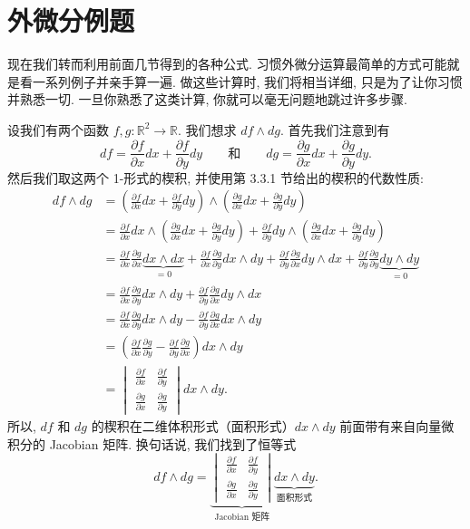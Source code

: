 \section{外微分例题}

现在我们转而利用前面几节得到的各种公式. 习惯外微分运算最简单的方式可能就是看一系列例子并亲手算一遍. 做这些计算时, 我们将相当详细, 只是为了让你习惯并熟悉一切. 一旦你熟悉了这类计算, 你就可以毫无问题地跳过许多步骤.

设我们有两个函数 $f,g:\mathbb{R}^2\to\mathbb{R}$. 我们想求 $df\wedge dg$. 首先我们注意到有
\[
df=\frac{\partial f}{\partial x}dx+\frac{\partial f}{\partial y}dy
\qquad\text{和}\qquad
dg=\frac{\partial g}{\partial x}dx+\frac{\partial g}{\partial y}dy.
\]
然后我们取这两个 1-形式的楔积, 并使用第 3.3.1 节给出的楔积的代数性质: 
\begin{align*}
df\wedge dg&=\left(\frac{\partial f}{\partial x}dx+\frac{\partial f}{\partial y}dy\right)
\wedge\left(\frac{\partial g}{\partial x}dx+\frac{\partial g}{\partial y}dy\right)\\
&=\frac{\partial f}{\partial x}dx\wedge\left(\frac{\partial g}{\partial x}dx+\frac{\partial g}{\partial y}dy\right)
+\frac{\partial f}{\partial y}dy\wedge\left(\frac{\partial g}{\partial x}dx+\frac{\partial g}{\partial y}dy\right)\\
&=\frac{\partial f}{\partial x}\frac{\partial g}{\partial x}\underbrace{dx\wedge dx}_{=0}
+\frac{\partial f}{\partial x}\frac{\partial g}{\partial y}dx\wedge dy
+\frac{\partial f}{\partial y}\frac{\partial g}{\partial x}dy\wedge dx
+\frac{\partial f}{\partial y}\frac{\partial g}{\partial y}\underbrace{dy\wedge dy}_{=0}\\
&=\frac{\partial f}{\partial x}\frac{\partial g}{\partial y}dx\wedge dy
+\frac{\partial f}{\partial y}\frac{\partial g}{\partial x}dy\wedge dx\\
&=\frac{\partial f}{\partial x}\frac{\partial g}{\partial y}dx\wedge dy
-\frac{\partial f}{\partial y}\frac{\partial g}{\partial x}dx\wedge dy\\
&=\left(\frac{\partial f}{\partial x}\frac{\partial g}{\partial y}-\frac{\partial f}{\partial y}\frac{\partial g}{\partial x}\right)dx\wedge dy\\
&=\begin{vmatrix}\frac{\partial f}{\partial x}&\frac{\partial f}{\partial y}\\[4pt]\frac{\partial g}{\partial x}&\frac{\partial g}{\partial y}\end{vmatrix}dx\wedge dy.
\end{align*}
所以, $df$ 和 $dg$ 的楔积在二维体积形式（面积形式）$dx\wedge dy$ 前面带有来自向量微积分的 Jacobian 矩阵. 换句话说, 我们找到了恒等式
\[
df\wedge dg=\underbrace{\begin{vmatrix}\frac{\partial f}{\partial x}&\frac{\partial f}{\partial y}\\[4pt]\frac{\partial g}{\partial x}&\frac{\partial g}{\partial y}\end{vmatrix}}_{\text{Jacobian 矩阵}}\underbrace{dx\wedge dy}_{\text{面积形式}}.
\]


